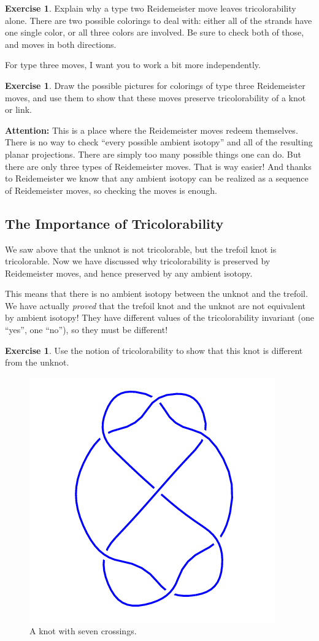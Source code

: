 \documentclass[12pt,letterpaper]{article}
\theoremstyle{definition}
\newtheorem{exercise}[question]{Exercise}
\begin{document}
\begin{exercise}
Explain why a type two Reidemeister move leaves tricolorability alone.
There are two possible colorings to deal with: either all of the strands have one single color, or all three colors are involved.
Be sure to check both of those, and moves in both directions.
\end{exercise}

For type three moves, I want you to work a bit more independently.

\begin{exercise}
Draw the possible pictures for colorings of type three Reidemeister moves, and use them to show that these moves preserve tricolorability of a knot or link.
\end{exercise}

\textbf{Attention:} This is a place where the Reidemeister moves redeem themselves. 
There is no way to check ``every possible ambient isotopy'' and all of the resulting planar projections.
There are simply too many possible things one can do.
But there are only three types of Reidemeister moves.
That is way easier!
And thanks to Reidemeister we know that any ambient isotopy can be realized as a sequence of Reidemeister moves, so checking the moves is enough.

\subsection*{The Importance of Tricolorability}

We saw above that the unknot is not tricolorable, but the trefoil knot is tricolorable.
Now we have discussed why tricolorability is preserved by Reidemeister moves, and hence preserved by any ambient isotopy. 

This means that there is no ambient isotopy between the unknot and the trefoil.
We have actually \emph{proved} that the trefoil knot and the unknot are not equivalent by ambient isotopy! They have different values of the tricolorability invariant (one ``yes'', one ``no''), so they must be different!


\begin{exercise}
Use the notion of tricolorability to show that this knot is different from the unknot.
\end{exercise}

\begin{figure}[h]
    \centering
    \includegraphics[width=.5\textwidth]{rgp08pics/7_4.png}
    \caption{A knot with seven crossings.}
\end{figure}
\end{document}
